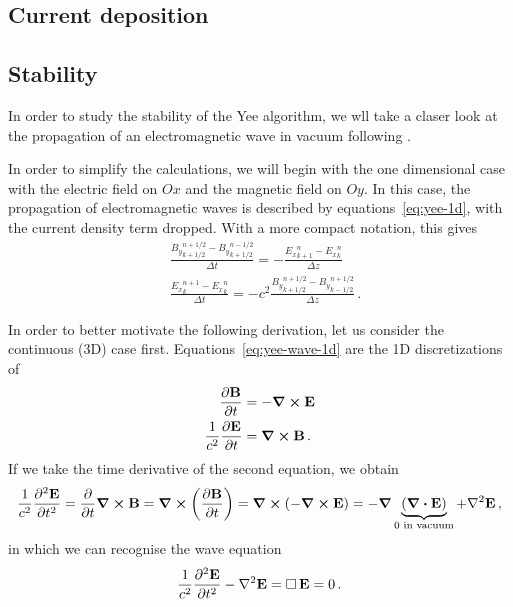 \documentclass[12pt, class=report, crop=false]{standalone}
\begin{document}
\subsection{Current deposition}

\subsection{Stability}

In order to study the stability of the Yee algorithm, we wll take a claser look
at the propagation of an electromagnetic wave in vacuum
following \textcite{lehe_electromagneticwave_2018}.

In order to simplify the calculations, we will begin with the one dimensional
case with the electric field on \(Ox\) and the magnetic field on \(Oy\).
In this case, the propagation of electromagnetic waves is described by
equations~\eqref{eq:yee-1d}, with the current density term dropped.
With a more compact notation, this gives
\begin{subequations}%
\label{eq:yee-wave-1d}
  \begin{align}
    &\frac{{B_y}^{n+1/2}_{k+1/2} - {B_y}^{n-1/2}_{k+1/2}}{\Delta t} =
    - \frac{{E_x}^n_{k+1} - {E_x}^n_k}{\Delta z} \label{eq:yee-wave-1d-faraday}\\
    &\frac{{E_x}^{n+1}_k - {E_x}^n_k}{\Delta t} =
    -c^2 \frac{{B_y}^{n+1/2}_{k+1/2} - {B_y}^{n+1/2}_{k-1/2}}{\Delta z}
    \label{eq:yee-wave-1d-ampere}\,.
  \end{align}
\end{subequations}

In order to better motivate the following derivation, let us consider the continuous
(3D) case first. Equations~\eqref{eq:yee-wave-1d} are the 1D discretizations
of
\[
\begin{aligned}
  \pdv{\vb{B}}{t} &= -\curl{\vb{E}} \\
  \frac{1}{c^2}\pdv{\vb{E}}{t} &= \curl{\vb{B}} \,.
\end{aligned}
\]
If we take the time derivative of the second equation, we obtain
\[
\frac{1}{c^2}\pdv[2]{\vb{E}}{t} = \pdv{t} \curl{\vb{B}} = \curl{\left(\pdv{\vb{B}}{t}\right)}
= \curl{\left(-\curl{\vb{E}}\right)} = - \grad{\underbrace{(\div{\vb{E}})}_{0\text{ in vacuum}}} + \laplacian{\vb{E}}\,,
\]
in which we can recognise the wave equation
\[
\frac{1}{c^2}\pdv[2]{\vb{E}}{t} - \laplacian{\vb{E}} = \dalambert{\vb{E}} = 0\,.
\]
\end{document}
